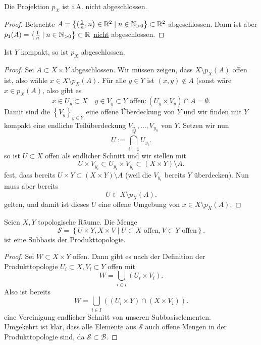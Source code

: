 \begin{remark}
    Die Projektion $p_X$ ist i.A. nicht abgeschlossen.
     \begin{proof}
         Betrachte $A = \left \{\left( \frac{1}{n},n \right) \in \mathbb{R}^2 \mid  n \in \mathbb{N}_{>0}\right\} \subset \mathbb{R}^2$  abgeschlossen. Dann ist aber $p_1(A) = \left \{\frac{1}{n}\mid n \in \mathbb{N}_{>0}\right\} \subset \mathbb{R}$ \underline{nicht} abgeschlossen.
    \end{proof}
\end{remark}
\begin{theorem}\label{thm:projektion-auf-x-ist-abgeschlossen-wenn-y-kompakt}
    Ist $Y$ kompakt, so ist  $p_X$ abgeschlossen. 
\end{theorem}
\begin{proof}
    Sei $A\subset X\times Y$ abgeschlossen. Wir müssen zeigen, dass $X \setminus p_X(A)$ offen ist, also wähle $x\in X \setminus p_X(A)$. Für alle $y\in Y$ ist $(x,y) \not\in A$ (sonst wäre $x\in p_X(A)$, also gibt es 
    \[
        x\in U_y \subset X \quad y\in V_y \subset Y \text{ offen} \colon (U_y \times V_y) \cap A = \emptyset
    .\] 
    Damit sind die $\left \{V_y\right\} _{y\in Y}$ eine offene Überdeckung von $Y$ und  wir finden mit  $Y$ kompakt eine endliche Teilüberdeckung  $V_{y_1},\ldots,V_{y_n}$ von $Y$. Setzen wir nun
     \[
    U := \bigcap_{i =1}^n U_{y_i} 
    .\] 
    so ist $U\subset X$ offen als endlicher Schnitt und wir stellen mit
    \[
        U\times V_{y_i} \subset U_{y_i}\times V_{y_i}\subset (X\times Y) \setminus A
    .\] 
    fest, dass bereits $U\times Y\subset (X\times Y)\setminus A$ (weil die $V_{y_i}$ bereits $Y$ überdecken). Nun muss aber bereits
     \[
         U\subset X \setminus p_X(A)
    .\] 
    gelten, und damit ist dieses $U$ eine offene Umgebung von  $x\in X \setminus p_X(A)$.
\end{proof}
\begin{lemma}\label{lm:subbasis-der-produkttopologie}
    Seien $X,Y$ topologische Räume. Die Menge
     \[
    \mathcal{S} = \left \{U\times Y, X\times V \mid  U\subset X \text{ offen}, V\subset Y \text{ offen}\right\} 
    .\] 
    ist eine Subbasis der Produkttopologie.
\end{lemma}
\begin{proof}
    Sei $W\subset X\times Y$ offen. Dann gibt es nach der Definition der Produkttopologie $U_i\subset X, V_i\subset Y$ offen mit
    \[
        W = \bigcup_{i \in  I} (U_i \times V_i)
    .\] 
    Also ist bereits
    \[
        W = \bigcup_{i \in  I} ((U_i\times Y) \cap (X\times V_i))
    .\] 
    eine Vereinigung endlicher Schnitt von unseren Subbasiselementen. \\
    Umgekehrt ist klar, dass alle Elemente aus $\mathcal{S}$ auch offene Mengen in der Produkttopologie sind, da $\mathcal{S} \subset \mathcal{B}$.
\end{proof}
